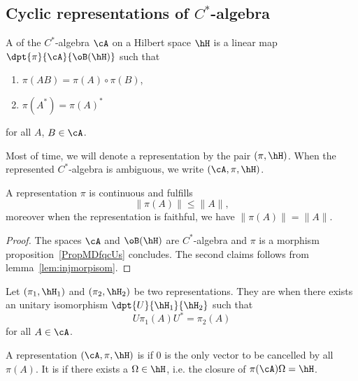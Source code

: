 \subsection{Cyclic representations of \texorpdfstring{$C^*$}{C*}-algebra }

\begin{definition}
	A  of the $C^*$-algebra $\cA$ on a Hilbert space $\hH$ is a linear map $\dpt{\pi}{\cA}{\oB(\hH)}$ such that

	\begin{enumerate}
		\item $\pi(AB)=\pi(A)\circ\pi(B)$,
		\item $\pi(A^*)=\pi(A)^*$
	\end{enumerate}
	for all $A$, $B\in\cA$.
\end{definition}
Most of time, we will denote a representation by the pair $(\pi,\hH)$. When the represented $C^*$-algebra is ambiguous, we write $(\cA,\pi,\hH)$.

\begin{lemma}       \label{Lemrepresnormpresou}
	A representation $\pi$ is continuous and fulfills
	\begin{equation}
		\| \pi(A) \|\leq \| A \|,
	\end{equation}
	moreover when the representation is faithful, we have $\| \pi(A) \|=\| A \|$.
\end{lemma}

\begin{proof}
	The spaces $\cA$ and $\oB(\hH)$ are $C^*$-algebra and $\pi$ is a morphism proposition~\ref{PropMDfqcUs} concludes. The second claims follows from lemma~\ref{lem:injmorpisom}.
\end{proof}

Let $(\pi_1,\hH_1)$ and $(\pi_2,\hH_2)$ be two representations. They are  when there exists an unitary isomorphism $\dpt{U}{\hH_1}{\hH_2}$ such that
\begin{equation}
	U\pi_1(A)U^*=\pi_2(A)
\end{equation}
for all $A\in\cA$.

A representation $(\cA,\pi,\hH)$ is  if $0$ is the only vector to be cancelled by all $\pi(A)$. It is  if there exists a  $\Omega\in\hH$, i.e. the closure of $\pi(\cA)\Omega=\hH$.


